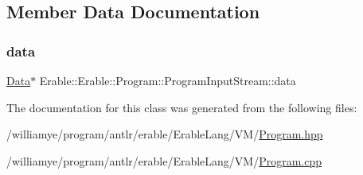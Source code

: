 \subsection{Member Data Documentation}
\mbox{\label{class_erable_1_1_erable_1_1_program_1_1_program_input_stream_a61bf88598cb82fe5fdf78c21aaf8cb35}} 
\subsubsection{\texorpdfstring{data}{data}}
{\footnotesize\ttfamily \mbox{\hyperlink{struct_erable_1_1_erable_1_1_program_1_1_data}{Data}}$\ast$ Erable\+::\+Erable\+::\+Program\+::\+Program\+Input\+Stream\+::data\hspace{0.3cm}{\ttfamily [private]}}



The documentation for this class was generated from the following files\+:\begin{DoxyCompactItemize}
\item 
/williamye/program/antlr/erable/\+Erable\+Lang/\+V\+M/\mbox{\hyperlink{_program_8hpp}{Program.\+hpp}}\item 
/williamye/program/antlr/erable/\+Erable\+Lang/\+V\+M/\mbox{\hyperlink{_program_8cpp}{Program.\+cpp}}\end{DoxyCompactItemize}
